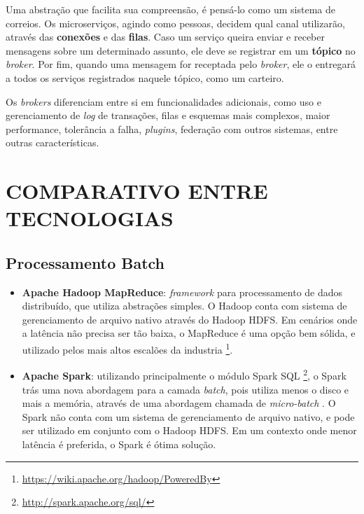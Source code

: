 Uma abstração que facilita sua compreensão, é pensá-lo como um sistema de
correios. Os microserviços, agindo como pessoas, decidem qual canal
utilizarão, através das \textbf{conexões} e das \textbf{filas}. Caso um serviço
queira enviar e receber mensagens sobre um determinado assunto, ele deve se
registrar em um \textbf{tópico} no \textit{broker}. Por fim, quando uma
mensagem for receptada pelo \textit{broker}, ele o entregará a todos os
serviços registrados naquele tópico, como um carteiro.

Os \textit{brokers} diferenciam entre si em funcionalidades adicionais, como
uso e gerenciamento de \textit{log} de transações, filas e esquemas mais
complexos, maior performance, tolerância a falha, \textit{plugins}, federação
com outros sistemas, entre outras características.

\section{COMPARATIVO ENTRE TECNOLOGIAS}

\subsection{Processamento Batch}

\begin{itemize}
    \item \textbf{Apache Hadoop MapReduce}: \textit{framework} para processamento
de dados distribuído, que utiliza abstrações simples. O Hadoop conta com sistema
de gerenciamento de arquivo nativo através do Hadoop HDFS. Em cenários onde a
latência não precisa ser tão baixa, o MapReduce é uma opção bem sólida, e
utilizado pelos mais altos escalões da
industria \footnote{\url{https://wiki.apache.org/hadoop/PoweredBy}}.

    \item \textbf{Apache Spark}: utilizando principalmente o módulo Spark SQL
\footnote{\url{http://spark.apache.org/sql/}}, o Spark trás uma nova abordagem
para a camada \textit{batch}, pois utiliza menos o disco e mais a memória,
através de uma abordagem chamada de \textit{micro-batch} \cite{arsalan2014}.
O Spark não conta com um sistema de gerenciamento de arquivo nativo, e pode
ser utilizado em conjunto com o Hadoop HDFS. Em um contexto onde menor latência
é preferida, o Spark é ótima solução.

\end{itemize}

